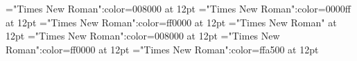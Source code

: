 \documentclass[a4paper]{article}
\begin{document}
 
\pagestyle{plain} 
\font\xitemenxitemmain="Times New Roman":color=008000 at 12pt
\font\xitemxitemmain="Times New Roman":color=0000ff at 12pt
\font\xitemmainmain="Times New Roman":color=ff0000 at 12pt
\font\main="Times New Roman" at 12pt
\font\xitemenxitem="Times New Roman":color=008000 at 12pt
\font\xitemmain="Times New Roman":color=ff0000 at 12pt
\font\xitemen="Times New Roman":color=ffa500 at 12pt
\pagestyle{fancy} 








\end{document}
